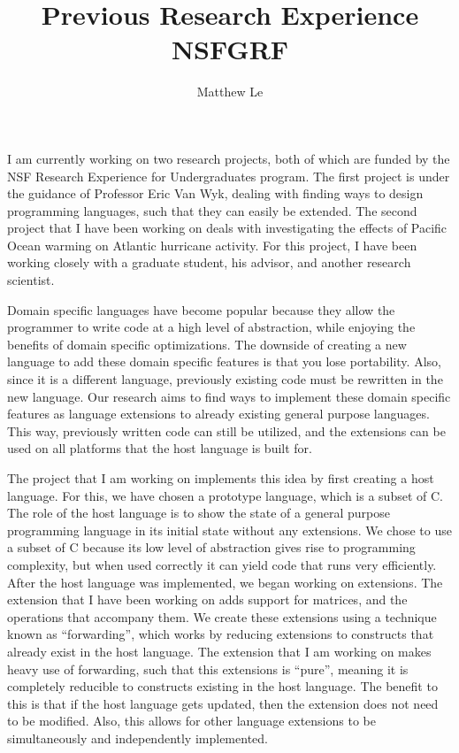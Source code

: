 \documentclass[a4paper,12pt]{article}
\title{Previous Research Experience NSFGRF \vspace{-1ex}}
\author{Matthew Le\vspace{-5ex}}
\begin{document}
\maketitle


I am currently working on two research projects, both of which are funded by the NSF Research Experience for Undergraduates program. The first project is under the guidance of Professor Eric Van Wyk, dealing with finding ways to design programming languages, such that they can easily be extended. The second project that I have been working on deals with investigating the effects of Pacific Ocean warming on Atlantic hurricane activity. For this project, I have been working closely with a graduate student, his advisor, and another research scientist.  

Domain specific languages have become popular because they allow the programmer to write code at a high level of abstraction, while enjoying the benefits of domain specific optimizations. The downside of creating a new language to add these domain specific features is that you lose portability. Also, since it is a different language, previously existing code must be rewritten in the new language. Our research aims to find ways to implement these domain specific features as language extensions to already existing general purpose languages. This way, previously written code can still be utilized, and the extensions can be used on all platforms that the host language is built for.  

The project that I am working on implements this idea by first creating a host language. For this, we have chosen a prototype language, which is a subset of C. The role of the host language is to show the state of a general purpose programming language in its initial state without any extensions.  We chose to use a subset of C because its low level of abstraction gives rise to programming complexity, but when used correctly it can yield code that runs very efficiently. After the host language was implemented, we began working on extensions. The extension that I have been working on adds support for matrices, and the operations that accompany them. We create these extensions using a technique known as ``forwarding'', which works by reducing extensions to constructs that already exist in the host language.  The extension that I am working on makes heavy use of forwarding, such that this extensions is ``pure'', meaning it is completely reducible to constructs existing in the host language.  The benefit to this is that if the host language gets updated, then the extension does not need to be modified.  Also, this allows for other language extensions to be simultaneously and independently implemented.
\end{document}
